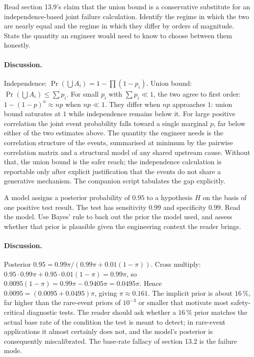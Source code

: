 \begin{exercise}
Read section 13.9's claim that the union bound is a conservative
substitute for an independence-based joint failure calculation.
Identify the regime in which the two are nearly equal and the
regime in which they differ by orders of magnitude. State the
quantity an engineer would need to know to choose between them
honestly.
\end{exercise}

\paragraph{Discussion.}
Independence: $\Pr(\bigcup A_{i}) = 1 - \prod (1 - p_{i})$. Union
bound: $\Pr(\bigcup A_{i}) \leq \sum p_{i}$. For small $p_{i}$ with
$\sum p_{i} \ll 1$, the two agree to first order: $1 - (1 - p)^{n}
\approx np$ when $np \ll 1$. They differ when $np$ approaches $1$:
union bound saturates at $1$ while independence remains below it.
For large positive correlation the joint event probability falls
toward a single marginal $p$, far below either of the two
estimates above. The quantity the engineer needs is the
correlation structure of the events, summarised at minimum by the
pairwise correlation matrix and a structural model of any shared
upstream cause. Without that, the union bound is the safer reach;
the independence calculation is reportable only after explicit
justification that the events do not share a generative mechanism.
The companion script
tabulates the gap explicitly.

\begin{exercise}
A model assigns a posterior probability of $0.95$ to a hypothesis
$H$ on the basis of one positive test result. The test has
sensitivity $0.99$ and specificity $0.99$. Read the model. Use
Bayes' rule to back out the prior the model used, and assess
whether that prior is plausible given the engineering context the
reader brings.
\end{exercise}

\paragraph{Discussion.}
Posterior $0.95 = 0.99 \pi / (0.99 \pi + 0.01 (1 - \pi))$. Cross
multiply: $0.95 \cdot 0.99 \pi + 0.95 \cdot 0.01 (1 - \pi) = 0.99
\pi$, so $0.0095 (1 - \pi) = 0.99 \pi - 0.9405 \pi = 0.0495 \pi$.
Hence $0.0095 = (0.0095 + 0.0495) \pi$, giving $\pi \approx 0.161$.
The implicit prior is about $16\,\%$, far higher than the rare-event
priors of $10^{-3}$ or smaller that motivate most safety-critical
diagnostic tests. The reader should ask whether a $16\,\%$ prior
matches the actual base rate of the condition the test is meant to
detect; in rare-event applications it almost certainly does not, and
the model's posterior is consequently miscalibrated. The base-rate
fallacy of section 13.2 is the failure mode.

